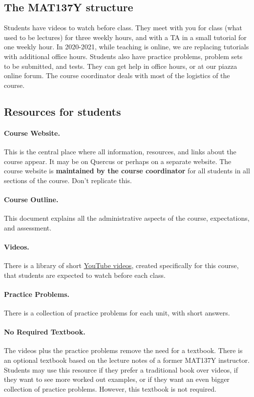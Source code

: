 \documentclass[11pt]{article}
\begin{document}
	\subsection{The MAT137Y structure}
	\label{sec:structure}

	Students have videos to watch before class. They meet with you for class (what
	used to be lectures) for three weekly hours, and with a TA in a small tutorial
	for one weekly hour. In 2020-2021, while teaching is online, we are replacing tutorials
	with additional office hours. Students also have practice problems, problem sets
	to be submitted, and tests. They can get help in office hours, or at our
	piazza online forum. The course coordinator deals with most of the logistics of
	the course.

	\subsection{Resources for students}

	\paragraph{Course Website.}
	This is the central place where all information, resources, and links about the
	course appear. It may be on Quercus or perhaps on a separate website. The course
	website is \textbf{maintained by the course coordinator} for all students in
	all sections of the course. Don't replicate this.
	\paragraph{Course Outline.}
	This document explains all the administrative aspects of the course,
	expectations, and assessment.
	\paragraph{Videos.}
	There is a library of short \href{https://www.youtube.com/channel/UCLzpR8AiHx9h_-yt2fAxd_A/playlists}{YouTube
	videos}, created specifically for this course, that students are expected to watch
	before each class.
	\paragraph{Practice Problems.}
	There is a collection of practice problems for each unit, with short answers.
	\paragraph{No Required Textbook.}
	The videos plus the practice problems remove the need for a textbook. There is
	an optional textbook based on the lecture notes of a former MAT137Y instructor.
	Students may use this resource if they prefer a traditional book over videos, if
	they want to see more worked out examples, or if they want an even bigger
	collection of practice problems. However, this textbook is not required.
\end{document}
